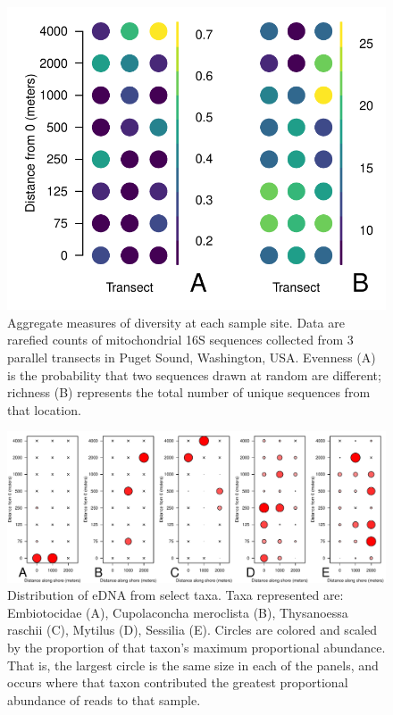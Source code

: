 \documentclass[11pt,letterpaper]{article} %
\begin{document}
\begin{figure}[H] %
  \centering
    \includegraphics[width=1\textwidth]{diversity.pdf}
    \caption{
		Aggregate measures of diversity at each sample site.
		Data are rarefied counts of mitochondrial 16S sequences collected from 3 parallel transects in Puget Sound, Washington, USA.
		Evenness (A) is the probability that two sequences drawn at random are different; richness (B) represents the total number of unique sequences from that location.
		}
  \label{diversity}
\end{figure}

\begin{figure}[H] %
  \centering
    \includegraphics[width=1\textwidth]{otu_in_space_select.pdf}
    \caption{
		Distribution of eDNA from select taxa.
		Taxa represented are: Embiotocidae (A), Cupolaconcha meroclista (B), Thysanoessa raschii (C), Mytilus (D), Sessilia (E). Circles are colored and scaled by the proportion of that taxon's maximum proportional abundance.
		That is, the largest circle is the same size in each of the panels, and occurs where that taxon contributed the greatest proportional abundance of reads to that sample.
		}
  \label{otu_in_space_select}
\end{figure}
\end{document}
